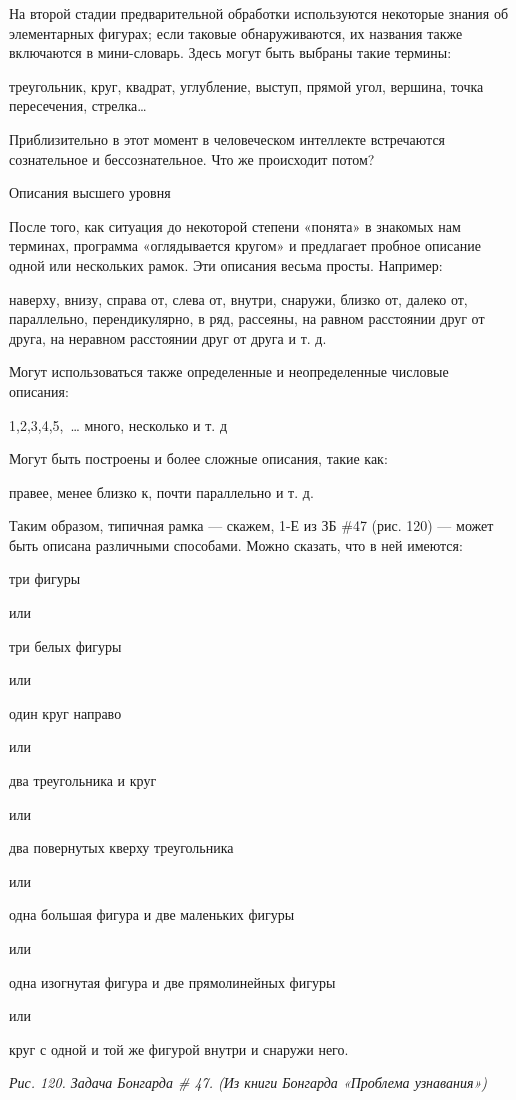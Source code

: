 \documentclass[../main.tex]{subfiles}
\begin{document}
На второй стадии предварительной обработки используются некоторые знания об элементарных фигурах; если таковые обнаруживаются, их названия также включаются в мини-словарь. Здесь могут быть выбраны такие термины:

треугольник, круг, квадрат, углубление, выступ, прямой угол, вершина, точка пересечения, стрелка\ldots{}

Приблизительно в этот момент в человеческом интеллекте встречаются сознательное и бессознательное. Что же происходит потом?

Описания высшего уровня

После того, как ситуация до некоторой степени «понята» в знакомых нам терминах, программа «оглядывается кругом» и предлагает пробное описание одной или нескольких рамок. Эти описания весьма просты. Например:

наверху, внизу, справа от, слева от, внутри, снаружи, близко от, далеко от, параллельно, перендикулярно, в ряд, рассеяны, на равном расстоянии друг от друга, на неравном расстоянии друг от друга и т. д.

Могут использоваться также определенные и неопределенные числовые описания:

1,2,3,4,5,~\ldots{} много, несколько и т. д

Могут быть построены и более сложные описания, такие как:

правее, менее близко к, почти параллельно и т. д.

Таким образом, типичная рамка --- скажем, 1-Е из ЗБ \#47 (рис. 120) --- может быть описана различными способами. Можно сказать, что в ней имеются:

три фигуры

или

три белых фигуры

или

один круг направо

или

два треугольника и круг

или

два повернутых кверху треугольника

или

одна большая фигура и две маленьких фигуры

или

одна изогнутая фигура и две прямолинейных фигуры

или

круг с одной и той же фигурой внутри и снаружи него.

\emph{Рис. 120. Задача Бонгарда \# 47. (Из книги Бонгарда «Проблема узнавания»)}
\end{document}
